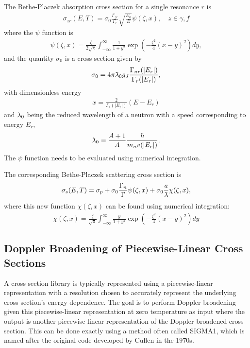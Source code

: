 The Bethe-Placzek absorption cross section for a single resonance $r$ is
\begin{align}
  \sigma_{zr}(E,T) = \sigma_0 \frac{\Gamma_{zr}}{\Gamma_r} \sqrt{ \frac{E_0}{E} } \psi(\zeta,x) , \quad z \in \gamma,f
\end{align}
where the $\psi$ function is
\begin{align}
  \psi(\zeta,x) = \frac{\zeta}{2\sqrt{\pi}} \int_{-\infty}^\infty \frac{1}{1+y^2} \exp \left( -\frac{\zeta^2}{4} ( x - y )^2 \right) dy , \label{Eq:nuclearData_DopplerBroadening_psi}
\end{align}
and the quantity $\sigma_0$ is a cross section given by
\begin{align}
  \sigma_0 = 4\pi \lambdabar_0 g_J \frac{ \Gamma_{nr}(|E_r|) }{ \Gamma_r(|E_r|) } ,
\end{align}
with dimensionless energy
\begin{align}
  x = \frac{2}{\Gamma_r(|E_r|)} ( E - E_r )
\end{align}
and $\lambdabar_0$ being the reduced wavelength of a neutron with a speed corresponding to energy $E_r$,
\begin{align}
  \lambdabar_0 = \frac{A+1}{A} \frac{\hbar}{ m_n v(|E_r|) }  .
\end{align} 
The $\psi$ function needs to be evaluated using numerical integration.

The corresponding Bethe-Placzek scattering cross section is
\begin{align}
  \sigma_s(E,T) = \sigma_p + \sigma_0 \frac{\Gamma_n}{\Gamma} \psi(\zeta,x) + \sigma_0 \frac{a}{\lambdabar} \chi(\zeta,x) ,
\end{align}
where this new function $\chi(\zeta,x)$ can be found using numerical integration:
\begin{align}
  \chi(\zeta,x) = \frac{\zeta}{\sqrt{\pi}} \int_{-\infty}^\infty \frac{y}{1+y^2} \exp \left( -\frac{\zeta^2}{4} ( x - y )^2 \right) dy
\end{align}

\subsection{Doppler Broadening of Piecewise-Linear Cross Sections}

A cross section library is typically represented using a piecewise-linear representation with a resolution chosen to accurately represent the underlying cross section's energy dependence. The goal is to perform Doppler broadening given this piecewise-linear representation at zero temperature as input where the output is another piecewise-linear representation of the Doppler broadened cross section. This can be done exactly using a method often called SIGMA1, which is named after the original code developed by Cullen in the 1970s.

